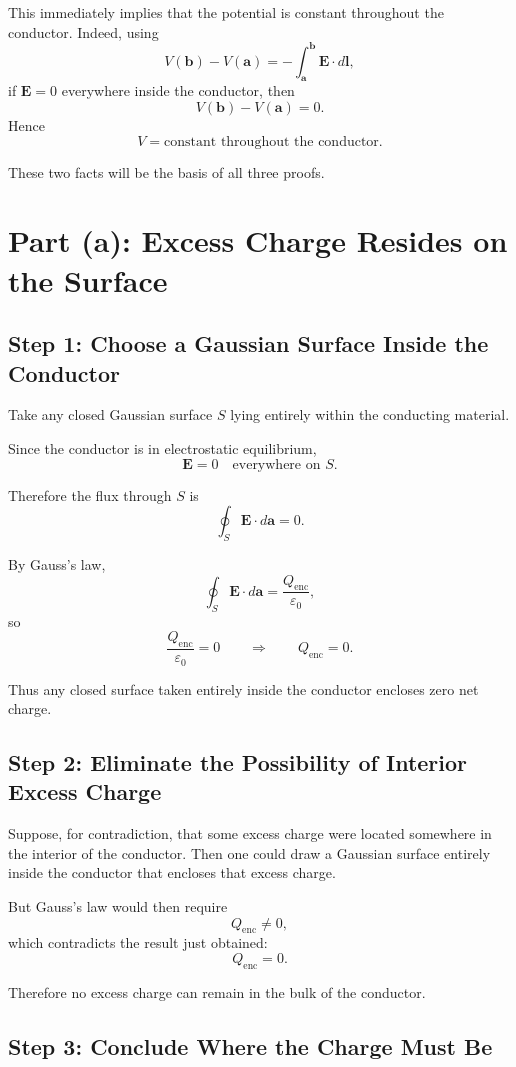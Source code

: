 \documentclass[hidelinks]{article}
\begin{document}
This immediately implies that the potential is constant throughout the conductor. Indeed, using
\[
V(\mathbf{b})-V(\mathbf{a})=-\int_{\mathbf{a}}^{\mathbf{b}} \mathbf{E}\cdot d\mathbf{l},
\]
if $\mathbf{E}=0$ everywhere inside the conductor, then
\[
V(\mathbf{b})-V(\mathbf{a})=0.
\]
Hence
\[
\boxed{V=\text{constant throughout the conductor.}}
\]

These two facts will be the basis of all three proofs.

\section{Part (a): Excess Charge Resides on the Surface}

\subsection{Step 1: Choose a Gaussian Surface Inside the Conductor}

Take any closed Gaussian surface $S$ lying entirely within the conducting material.

Since the conductor is in electrostatic equilibrium,
\[
\mathbf{E}=0
\quad \text{everywhere on } S.
\]

Therefore the flux through $S$ is
\[
\oint_S \mathbf{E}\cdot d\mathbf{a}=0.
\]

By Gauss's law,
\[
\oint_S \mathbf{E}\cdot d\mathbf{a}=\frac{Q_{\mathrm{enc}}}{\varepsilon_0},
\]
so
\[
\frac{Q_{\mathrm{enc}}}{\varepsilon_0}=0
\qquad \Rightarrow \qquad
Q_{\mathrm{enc}}=0.
\]

Thus any closed surface taken entirely inside the conductor encloses zero net charge.

\subsection{Step 2: Eliminate the Possibility of Interior Excess Charge}

Suppose, for contradiction, that some excess charge were located somewhere in the interior of the conductor. Then one could draw a Gaussian surface entirely inside the conductor that encloses that excess charge.

But Gauss's law would then require
\[
Q_{\mathrm{enc}}\neq 0,
\]
which contradicts the result just obtained:
\[
Q_{\mathrm{enc}}=0.
\]

Therefore no excess charge can remain in the bulk of the conductor.

\subsection{Step 3: Conclude Where the Charge Must Be}
\end{document}
